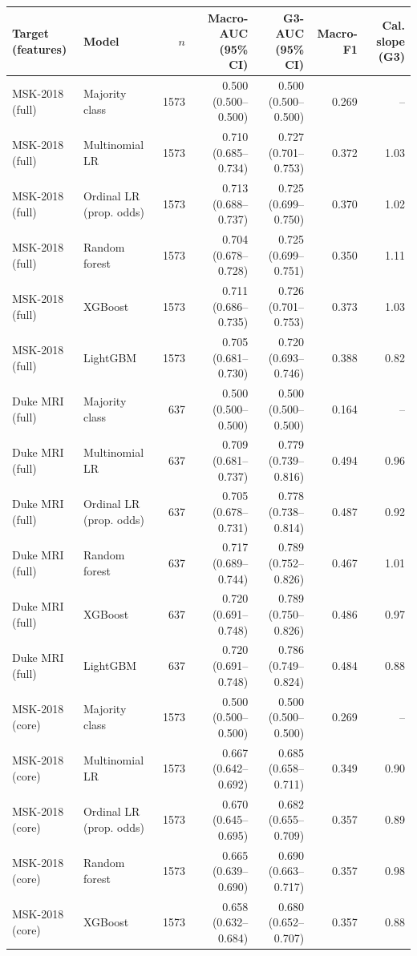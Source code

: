 \begin{tabular}{llrrrrr}
\toprule
Target (features) & Model & $n$ & Macro-AUC (95\% CI) & G3-AUC (95\% CI) & Macro-F1 & Cal. slope (G3) \\
\midrule
MSK-2018 (full) & Majority class & 1573 & 0.500 (0.500--0.500) & 0.500 (0.500--0.500) & 0.269 & -- \\
MSK-2018 (full) & Multinomial LR & 1573 & 0.710 (0.685--0.734) & 0.727 (0.701--0.753) & 0.372 & 1.03 \\
MSK-2018 (full) & Ordinal LR (prop. odds) & 1573 & 0.713 (0.688--0.737) & 0.725 (0.699--0.750) & 0.370 & 1.02 \\
MSK-2018 (full) & Random forest & 1573 & 0.704 (0.678--0.728) & 0.725 (0.699--0.751) & 0.350 & 1.11 \\
MSK-2018 (full) & XGBoost & 1573 & 0.711 (0.686--0.735) & 0.726 (0.701--0.753) & 0.373 & 1.03 \\
MSK-2018 (full) & LightGBM & 1573 & 0.705 (0.681--0.730) & 0.720 (0.693--0.746) & 0.388 & 0.82 \\
\addlinespace
Duke MRI (full) & Majority class & 637 & 0.500 (0.500--0.500) & 0.500 (0.500--0.500) & 0.164 & -- \\
Duke MRI (full) & Multinomial LR & 637 & 0.709 (0.681--0.737) & 0.779 (0.739--0.816) & 0.494 & 0.96 \\
Duke MRI (full) & Ordinal LR (prop. odds) & 637 & 0.705 (0.678--0.731) & 0.778 (0.738--0.814) & 0.487 & 0.92 \\
Duke MRI (full) & Random forest & 637 & 0.717 (0.689--0.744) & 0.789 (0.752--0.826) & 0.467 & 1.01 \\
Duke MRI (full) & XGBoost & 637 & 0.720 (0.691--0.748) & 0.789 (0.750--0.826) & 0.486 & 0.97 \\
Duke MRI (full) & LightGBM & 637 & 0.720 (0.691--0.748) & 0.786 (0.749--0.824) & 0.484 & 0.88 \\
\addlinespace
MSK-2018 (core) & Majority class & 1573 & 0.500 (0.500--0.500) & 0.500 (0.500--0.500) & 0.269 & -- \\
MSK-2018 (core) & Multinomial LR & 1573 & 0.667 (0.642--0.692) & 0.685 (0.658--0.711) & 0.349 & 0.90 \\
MSK-2018 (core) & Ordinal LR (prop. odds) & 1573 & 0.670 (0.645--0.695) & 0.682 (0.655--0.709) & 0.357 & 0.89 \\
MSK-2018 (core) & Random forest & 1573 & 0.665 (0.639--0.690) & 0.690 (0.663--0.717) & 0.357 & 0.98 \\
MSK-2018 (core) & XGBoost & 1573 & 0.658 (0.632--0.684) & 0.680 (0.652--0.707) & 0.357 & 0.88 \\

\end{tabular}
